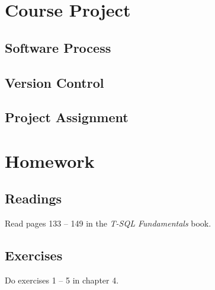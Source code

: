 \documentclass{article}
\begin{document}
    \section{Course Project}


        \subsection{Software Process}

        
        \subsection{Version Control}


        \subsection{Project Assignment}

    \section{Homework}


        \subsection{Readings}

        Read pages 133 -- 149 in the \textit{T-SQL Fundamentals} book.
        
        \subsection{Exercises}

        Do exercises 1 -- 5 in chapter 4.
\end{document}
